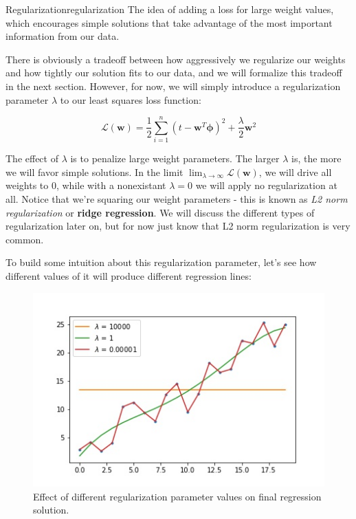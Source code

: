 \begin{definition}{Regularization}{regularization}
    The idea of adding a loss for large weight values, which encourages simple solutions that take advantage of the most important information from our data.
\end{definition}

There is obviously a tradeoff between how aggressively we regularize our weights and how tightly our solution fits to our data, and we will formalize this tradeoff in the next section. However, for now, we will simply introduce a regularization parameter $\lambda$ to our least squares loss function:

\begin{equation} \label{least-squares-loss-fn-w-regularization}
    \mathcal{L}(\textbf{w}) = \frac{1}{2} \sum_{i=1}^{n} (t - \textbf{w}^{T}\boldsymbol{\phi})^2 + \frac{\lambda}{2}\textbf{w}^{2}
\end{equation}

The effect of $\lambda$ is to penalize large weight parameters. The larger $\lambda$ is, the more we will favor simple solutions. In the limit $\lim_{\lambda\to\infty} \mathcal{L}(\textbf{w})$, we will drive all weights to 0, while with a nonexistant $\lambda = 0$ we will apply no regularization at all. Notice that we're squaring our weight parameters - this is known as \textit{L2 norm regularization} or \textbf{ridge regression}. We will discuss the different types of regularization later on, but for now just know that L2 norm regularization is very common.

To build some intuition about this regularization parameter, let's see how different values of it will produce different regression lines:

\begin{figure}
    \centering
    \includegraphics[width=0.5\paperwidth]{../LinearRegression/fig/diffregvalues_GEN.jpg}
    \caption{Effect of different regularization parameter values on final regression solution.}
    \label{fig:ridge-reg-diff-values}
\end{figure}


